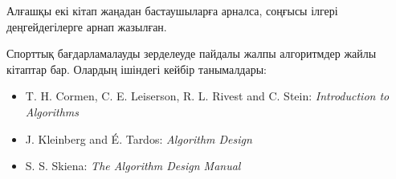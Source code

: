 Алғашқы екі кітап жаңадан бастаушыларға арналса, соңғысы ілгері деңгейдегілерге арнап жазылған.

Спорттық бағдарламалауды зерделеуде пайдалы жалпы алгоритмдер жайлы  кітаптар бар.
Олардың ішіндегі кейбір танымалдары:

\begin{itemize}
\item T. H. Cormen, C. E. Leiserson, R. L. Rivest and C. Stein:
\emph{Introduction to Algorithms} \cite{cor09}
\item J. Kleinberg and É. Tardos:
\emph{Algorithm Design} \cite{kle05}
\item S. S. Skiena:
\emph{The Algorithm Design Manual} \cite{ski08}
\end{itemize}
